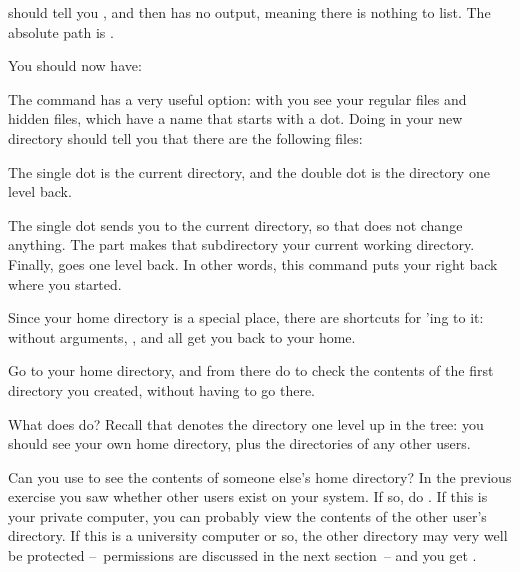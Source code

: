 { should tell you , and  then has no
  output, meaning there is nothing to list. 
  The absolute path is .}{}

{You should now have:
}{}

The  command has a very useful option: with  you see
your regular files and hidden files, which have a name that starts
with a dot. Doing  in your new directory should tell you that
there are the following files:


The single dot is the
current directory, and the double dot is the directory one level
back. 

{The single dot sends you to the current directory, so that does not
  change anything. The  part makes that subdirectory your
  current working directory. Finally,  goes one level back. In
  other words, this command puts your right back where you started.}{}

Since your home directory is a special place, there are shortcuts for
'ing to it:  without arguments, , and 
  all get you back to your home.

Go to your home directory, and from there do  to check
the contents of the first directory you created, without having to go
there.

\practical
{What does  do?}
{Recall that  denotes the
  directory one level up in the tree: you should see your own home
  directory, plus the directories of any other users.}{}

\practical
{Can you use  to see the
contents of someone else's home directory? In the previous exercise
  you saw whether other users exist on your system. If so, do .}
{If this is your private computer, you can
  probably view the contents of the other user's directory. If this is
  a university computer or so, the other directory may very well be
  protected --~permissions are discussed in the next section~-- and
  you get .}{}


